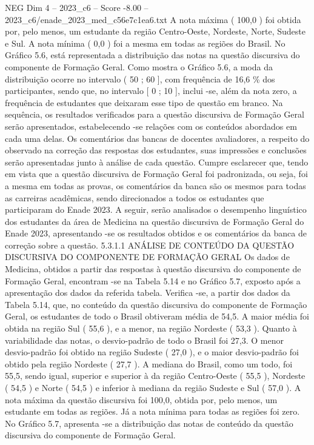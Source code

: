 \begin{textsample}{NEG Dim 4 – 2023\_c6 – Score -8.00 – 2023\_c6/enade\_2023\_med\_c56e7c1ea6.txt}
A nota máxima ( 100,0 ) foi obtida por, pelo menos, um estudante da região Centro-Oeste, Nordeste, Norte, Sudeste e Sul.
A nota mínima ( 0,0 ) foi a mesma em todas as regiões do Brasil.
No Gráfico 5.6, está representada a distribuição das notas na questão discursiva do componente de Formação Geral.
Como mostra o Gráfico 5.6, a moda da distribuição ocorre no intervalo ( 50 ; 60 ], com frequência de 16,6 \% dos participantes, sendo que, no intervalo [ 0 ; 10 ], inclui -se, além da nota zero, a frequência de estudantes que deixaram esse tipo de questão em branco.
Na sequência, os resultados verificados para a questão discursiva de Formação Geral serão apresentados, estabelecendo -se relações com os conteúdos abordados em cada uma delas.
Os comentários das bancas de docentes avaliadores, a respeito do observado na correção das respostas dos estudantes, suas impressões e conclusões serão apresentadas junto à análise de cada questão.
Cumpre esclarecer que, tendo em vista que a questão discursiva de Formação Geral foi padronizada, ou seja, foi a mesma em todas as provas, os comentários da banca são os mesmos para todas as carreiras acadêmicas, sendo direcionados a todos os estudantes que participaram do Enade 2023.
A seguir, serão analisados o desempenho linguístico dos estudantes da área de Medicina na questão discursiva de Formação Geral do Enade 2023, apresentando -se os resultados obtidos e os comentários da banca de correção sobre a questão. 5.3.1.1 ANÁLISE DE CONTEÚDO DA QUESTÃO DISCURSIVA DO COMPONENTE DE FORMAÇÃO GERAL Os dados de Medicina, obtidos a partir das respostas à questão discursiva do componente de Formação Geral, encontram -se na Tabela 5.14 e no Gráfico 5.7, exposto após a apresentação dos dados da referida tabela.
Verifica -se, a partir dos dados da Tabela 5.14, que, no conteúdo da questão discursiva do componente de Formação Geral, os estudantes de todo o Brasil obtiveram média de 54,5.
A maior média foi obtida na região Sul ( 55,6 ), e a menor, na região Nordeste ( 53,3 ).
Quanto à variabilidade das notas, o desvio-padrão de todo o Brasil foi 27,3.
O menor desvio-padrão foi obtido na região Sudeste ( 27,0 ), e o maior desvio-padrão foi obtido pela região Nordeste ( 27,7 ).
A mediana do Brasil, como um todo, foi 55,5, sendo igual, superior e superior à da região Centro-Oeste ( 55,5 ), Nordeste ( 54,5 ) e Norte ( 54,5 ) e inferior à mediana da região Sudeste e Sul ( 57,0 ).
A nota máxima da questão discursiva foi 100,0, obtida por, pelo menos, um estudante em todas as regiões.
Já a nota mínima para todas as regiões foi zero.
No Gráfico 5.7, apresenta -se a distribuição das notas de conteúdo da questão discursiva do componente de Formação Geral.

\end{textsample}
